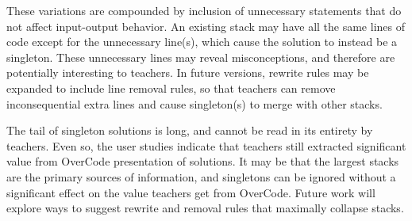 These variations are compounded by inclusion of unnecessary statements that do not affect input-output behavior. An existing stack may have all the same lines of code except for the unnecessary line(s), which cause the solution to instead be a singleton. These unnecessary lines may reveal misconceptions, and therefore are potentially interesting to teachers. In future versions, rewrite rules may be expanded to include line removal rules, so that teachers can remove inconsequential extra lines and cause singleton(s) to merge with other stacks. 

The tail of singleton solutions is long, and cannot be read in its entirety by teachers. Even so, the user studies indicate that teachers still extracted significant value from OverCode presentation of solutions. It may be that the largest stacks are the primary sources of information, and singletons can be ignored without a significant effect on the value teachers get from OverCode. Future work will explore ways to suggest rewrite and removal rules that maximally collapse stacks.

